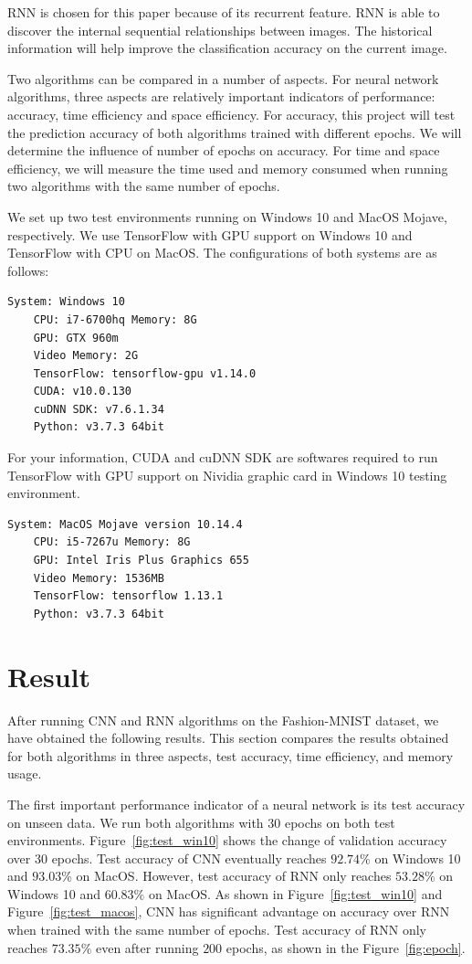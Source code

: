 \documentclass[letterpaper]{article} %
\begin{document}
	RNN is chosen for this paper because of its recurrent feature. RNN is able to discover the internal sequential relationships between images. The historical information will help improve the classification accuracy on the current image.
	
	Two algorithms can be compared in a number of aspects. For neural network algorithms, three aspects are relatively important indicators of performance: accuracy, time efficiency and space efficiency. For accuracy, this project will test the prediction accuracy of both algorithms trained with different epochs. We will determine the influence of number of epochs on accuracy. For time and space efficiency, we will measure the time used and memory consumed when running two algorithms with the same number of epochs.
	
	We set up two test environments running on Windows 10 and MacOS Mojave, respectively. We use TensorFlow with GPU support on Windows 10 and TensorFlow with CPU on MacOS. The configurations of both systems are as follows:
	\begin{lstlisting}[columns=fullflexible, keepspaces=true, stepnumber=1]
	System: Windows 10
	CPU: i7-6700hq Memory: 8G
	GPU: GTX 960m 
	Video Memory: 2G
	TensorFlow: tensorflow-gpu v1.14.0
	CUDA: v10.0.130
	cuDNN SDK: v7.6.1.34
	Python: v3.7.3 64bit
	\end{lstlisting}
	For your information, CUDA and cuDNN SDK are softwares required to run TensorFlow with GPU support on Nividia graphic card in Windows 10 testing environment.
	\begin{lstlisting}[columns=fullflexible, keepspaces=true, stepnumber=1]
	System: MacOS Mojave version 10.14.4
	CPU: i5-7267u Memory: 8G
	GPU: Intel Iris Plus Graphics 655 
	Video Memory: 1536MB
	TensorFlow: tensorflow 1.13.1
	Python: v3.7.3 64bit
	\end{lstlisting}
	
	\section{Result}

After running CNN and RNN algorithms on the Fashion-MNIST dataset, we have obtained the following results. This section compares the results obtained for both algorithms in three aspects, test accuracy, time efficiency, and memory usage.

The first important performance indicator of a neural network is its test accuracy on unseen data. We run both algorithms with 30 epochs on both test environments. Figure~\ref{fig:test_win10} shows the change of validation accuracy over 30 epochs. Test accuracy of CNN eventually reaches $92.74\%$ on Windows 10 and $93.03\%$ on MacOS.  However, test accuracy of RNN only reaches $53.28\%$ on Windows 10 and $60.83\%$ on MacOS. As shown in Figure~\ref{fig:test_win10} and Figure~\ref{fig:test_macos}, CNN has significant advantage on accuracy over RNN when trained with the same number of epochs. Test accuracy of RNN only reaches $73.35\%$ even after running $200$ epochs, as shown in the Figure~\ref{fig:epoch}.
	
\end{document}
